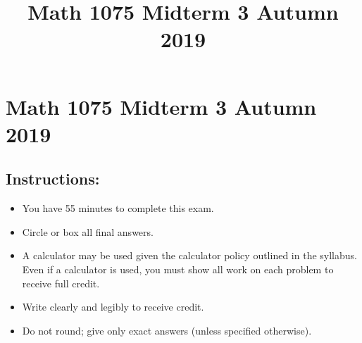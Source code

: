 \documentclass{ximera}
\title{Math 1075 Midterm 3 Autumn 2019}
\begin{document}
\section*{Math 1075 Midterm 3 Autumn 2019}

\subsection*{Instructions:}
\begin{itemize}
  \item You have 55 minutes to complete this exam.
  \item Circle or box all final answers.
  \item A calculator may be used given the calculator policy outlined in the syllabus. Even if a calculator is used, you must show all work on each problem to receive full credit.
  \item Write clearly and legibly to receive credit.
  \item Do not round; give only exact answers (unless specified otherwise).
\end{itemize}
\end{document}
